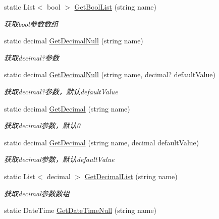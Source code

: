 \begin{DoxyCompactItemize}
static List$<$ bool $>$ \hyperlink{class_x_c_l_net_tools_1_1_string_hander_1_1_form_helper_a134c9765f209b53268358ab4f2bf2821}{Get\+Bool\+List} (string name)
\begin{DoxyCompactList}\small\item\em 获取bool参数数组 \end{DoxyCompactList}\item 
static decimal \hyperlink{class_x_c_l_net_tools_1_1_string_hander_1_1_form_helper_a67ca5ec273b5b94c20a6fd79b0e3c3f7}{Get\+Decimal\+Null} (string name)
\begin{DoxyCompactList}\small\item\em 获取decimal?参数 \end{DoxyCompactList}\item 
static decimal \hyperlink{class_x_c_l_net_tools_1_1_string_hander_1_1_form_helper_a5d658cf4e05e92ebcc10d859e72c7d80}{Get\+Decimal\+Null} (string name, decimal? default\+Value)
\begin{DoxyCompactList}\small\item\em 获取decimal?参数，默认default\+Value \end{DoxyCompactList}\item 
static decimal \hyperlink{class_x_c_l_net_tools_1_1_string_hander_1_1_form_helper_a61ef0cfc5b32dadd67700c5f307850d3}{Get\+Decimal} (string name)
\begin{DoxyCompactList}\small\item\em 获取decimal参数，默认0 \end{DoxyCompactList}\item 
static decimal \hyperlink{class_x_c_l_net_tools_1_1_string_hander_1_1_form_helper_ab147eaeb86996c9c03099a5bd6d6ac6d}{Get\+Decimal} (string name, decimal default\+Value)
\begin{DoxyCompactList}\small\item\em 获取decimal参数，默认default\+Value \end{DoxyCompactList}\item 
static List$<$ decimal $>$ \hyperlink{class_x_c_l_net_tools_1_1_string_hander_1_1_form_helper_ab3f5108e85eb8bf10ab5317e77bc1f2c}{Get\+Decimal\+List} (string name)
\begin{DoxyCompactList}\small\item\em 获取decimal参数数组 \end{DoxyCompactList}\item 
static Date\+Time \hyperlink{class_x_c_l_net_tools_1_1_string_hander_1_1_form_helper_a420660ded9f4960446f03cede154198b}{Get\+Date\+Time\+Null} (string name)

\end{DoxyCompactItemize}
